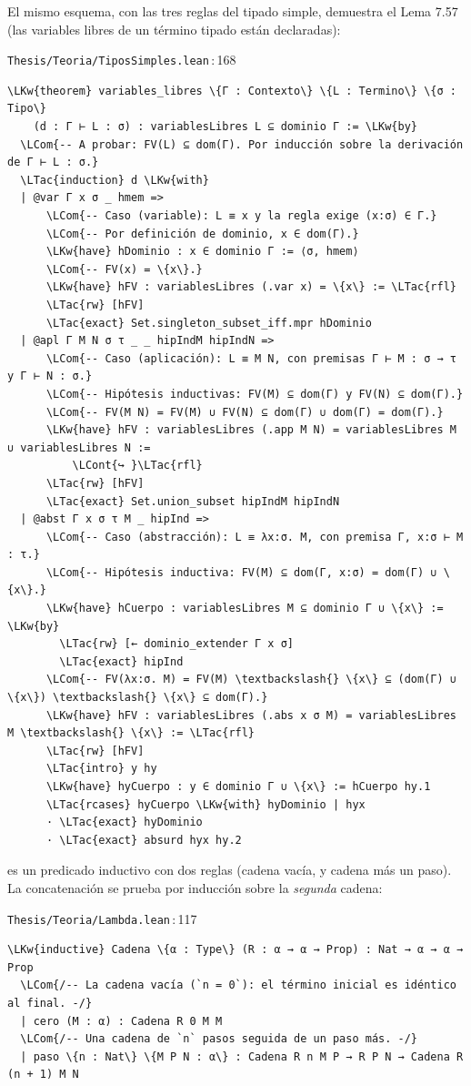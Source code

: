 \documentclass[11pt,a4paper]{article}
\newcommand{\LKw}[1]{\textcolor{kw}{\bfseries #1}}
\newcommand{\LTac}[1]{\textcolor{tac}{\bfseries #1}}
\newcommand{\LCom}[1]{\textcolor{com}{\itshape #1}}
\newcommand{\LCont}[1]{\textcolor{gray}{#1}}
\newcommand{\lean}[1]{\texttt{\directlua{leanbreak("\luaescapestring{\detokenize{#1}}")}}}
\newcommand{\ruta}[2]{\texttt{#1}\,:\,#2}
\begin{document}
El mismo esquema, con las tres reglas del tipado simple, demuestra el Lema
7.57 (las variables libres de un término tipado están declaradas):
\begin{codigolean}{\ruta{Thesis/Teoria/TiposSimples.lean}{168}}
\begin{Verbatim}[commandchars=\\\{\}]
\LKw{theorem} variables_libres \{Γ : Contexto\} \{L : Termino\} \{σ : Tipo\}
    (d : Γ ⊢ L : σ) : variablesLibres L ⊆ dominio Γ := \LKw{by}
  \LCom{-- A probar: FV(L) ⊆ dom(Γ). Por inducción sobre la derivación de Γ ⊢ L : σ.}
  \LTac{induction} d \LKw{with}
  | @var Γ x σ _ hmem =>
      \LCom{-- Caso (variable): L ≡ x y la regla exige (x:σ) ∈ Γ.}
      \LCom{-- Por definición de dominio, x ∈ dom(Γ).}
      \LKw{have} hDominio : x ∈ dominio Γ := ⟨σ, hmem⟩
      \LCom{-- FV(x) = \{x\}.}
      \LKw{have} hFV : variablesLibres (.var x) = \{x\} := \LTac{rfl}
      \LTac{rw} [hFV]
      \LTac{exact} Set.singleton_subset_iff.mpr hDominio
  | @apl Γ M N σ τ _ _ hipIndM hipIndN =>
      \LCom{-- Caso (aplicación): L ≡ M N, con premisas Γ ⊢ M : σ → τ y Γ ⊢ N : σ.}
      \LCom{-- Hipótesis inductivas: FV(M) ⊆ dom(Γ) y FV(N) ⊆ dom(Γ).}
      \LCom{-- FV(M N) = FV(M) ∪ FV(N) ⊆ dom(Γ) ∪ dom(Γ) = dom(Γ).}
      \LKw{have} hFV : variablesLibres (.app M N) = variablesLibres M ∪ variablesLibres N :=
          \LCont{↪ }\LTac{rfl}
      \LTac{rw} [hFV]
      \LTac{exact} Set.union_subset hipIndM hipIndN
  | @abst Γ x σ τ M _ hipInd =>
      \LCom{-- Caso (abstracción): L ≡ λx:σ. M, con premisa Γ, x:σ ⊢ M : τ.}
      \LCom{-- Hipótesis inductiva: FV(M) ⊆ dom(Γ, x:σ) = dom(Γ) ∪ \{x\}.}
      \LKw{have} hCuerpo : variablesLibres M ⊆ dominio Γ ∪ \{x\} := \LKw{by}
        \LTac{rw} [← dominio_extender Γ x σ]
        \LTac{exact} hipInd
      \LCom{-- FV(λx:σ. M) = FV(M) \textbackslash{} \{x\} ⊆ (dom(Γ) ∪ \{x\}) \textbackslash{} \{x\} ⊆ dom(Γ).}
      \LKw{have} hFV : variablesLibres (.abs x σ M) = variablesLibres M \textbackslash{} \{x\} := \LTac{rfl}
      \LTac{rw} [hFV]
      \LTac{intro} y hy
      \LKw{have} hyCuerpo : y ∈ dominio Γ ∪ \{x\} := hCuerpo hy.1
      \LTac{rcases} hyCuerpo \LKw{with} hyDominio | hyx
      · \LTac{exact} hyDominio
      · \LTac{exact} absurd hyx hy.2
\end{Verbatim}
\end{codigolean}
\lean{Cadena} es un predicado inductivo con dos reglas (cadena vacía, y cadena
más un paso). La concatenación se prueba por inducción sobre la
\emph{segunda} cadena:
\begin{codigolean}{\ruta{Thesis/Teoria/Lambda.lean}{117}}
\begin{Verbatim}[commandchars=\\\{\}]
\LKw{inductive} Cadena \{α : Type\} (R : α → α → Prop) : Nat → α → α → Prop
  \LCom{/-- La cadena vacía (`n = 0`): el término inicial es idéntico al final. -/}
  | cero (M : α) : Cadena R 0 M M
  \LCom{/-- Una cadena de `n` pasos seguida de un paso más. -/}
  | paso \{n : Nat\} \{M P N : α\} : Cadena R n M P → R P N → Cadena R (n + 1) M N
\end{Verbatim}
\end{codigolean}
\end{document}
